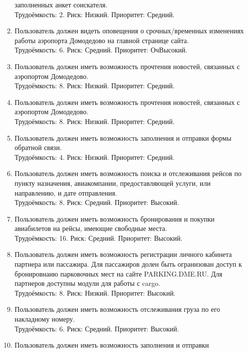 \begin{enumerate}
          заполненных анкет соискателя. \\
          Трудоёмкость: 2. Риск: Низкий. Приоритет: Средний.
    \item Пользователь должен видеть оповещения о срочных/временных
          изменениях работы аэропорта Домодедово на главной странице сайта. \\
          Трудоёмкость: 6. Риск: Средний. Приоритет: ОчВысокий.
    \item Пользователь должен иметь возможность прочтения новостей,
          связанных с аэропортом Домодедово. \\
          Трудоёмкость: 8. Риск: Низкий. Приоритет: Средний.
    \item Пользователь должен иметь возможность прочтения новостей,
          связанных с аэропортом Домодедово. \\
          Трудоёмкость: 8. Риск: Низкий. Приоритет: Средний.
    \item Пользователь должен иметь возможность заполнения и 
          отправки формы обратной связи. \\
          Трудоёмкость: 4. Риск: Низкий. Приоритет: Средний.
    \item Пользователь должен иметь возможность поиска и отслеживания 
          рейсов по пункту назначения, авиакомпании, предоставляющей услуги, 
          или направлению, и дате отправления. \\
          Трудоёмкость: 8. Риск: Средний. Приоритет: Высокий.
    \item Пользователь должен иметь возможность бронирования и 
          покупки авиабилетов на рейсы, имеющие свободные места. \\
          Трудоёмкость: 16. Риск: Средний. Приоритет: Высокий.
    \item Пользователь должен иметь возможность регистрации личного 
          кабинета партнера или пассажира. Для пассажиров долен быть 
          огранизован доступ к бронировнаию парковочных мест на сайте 
          PARKING.DME.RU. Для партнеров доступны модули для работы с cargo. \\
          Трудоёмкость: 8. Риск: Низкий. Приоритет: Высокий.
    \item Пользователь должен иметь возможность отслеживания груза 
          по его накладному номеру. \\
          Трудоёмкость: 6. Риск: Средний. Приоритет: Высокий.
    \item Пользователь должен иметь возможность заполнения и отправки 

\end{enumerate}
